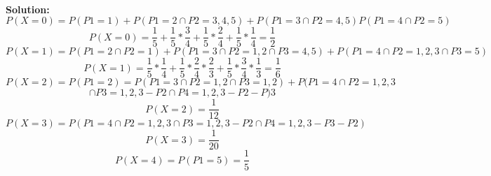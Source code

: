\documentclass{article}
\begin{document}
\paragraph{
Solution:\newline 
$$P(X = 0) = P(P1=1) + P(P1=2 \cap P2=3,4,5) + P(P1 = 3 \cap P2 = 4,5) P(P1 = 4 \cap P2 = 5)$$\newline $$P(X=0) = \frac{1}{5} + \frac{1}{5}*\frac{3}{4} + \frac{1}{5}*\frac{2}{4} + \frac{1}{5}*\frac{1}{4} = \frac{1}{2}$$\newline
$$P(X = 1) = P(P1 = 2 \cap P2 = 1) + P(P1 = 3 \cap P2 = 1, 2 \cap P3 = 4, 5) + P(P1 = 4 \cap P2 = 1, 2, 3 \cap P3 = 5)$$\newline
$$P(X = 1) = \frac{1}{5} * \frac{1}{4} + \frac{1}{5} * \frac{2}{4} * \frac{2}{3} + \frac{1}{5} * \frac{3}{4} * \frac{1}{3} = \frac{1}{6}$$
$$P(X = 2) = P(P1 = 2) = P(P1 = 3 \cap P2 = 1, 2 \cap P3 = 1, 2) + P(P1 = 4 \cap P2 = 1, 2, 3$$\newline
$$\cap P3 = 1, 2, 3 - P2 \cap P4 = 1, 2, 3 - P2 - P)3$$
$$P(X=2)=\frac{1}{12}$$
$$P(X=3)=P(P1 = 4 \cap P2 = 1, 2, 3 \cap P3 = 1, 2, 3 - P2 \cap P4 = 1, 2, 3 - P3 - P2)$$\newline
$$P(X = 3) = \frac{1}{20}$$
$$P(X = 4) = P(P1 = 5) = \frac{1}{5}$$\newpage
}
\end{document}
